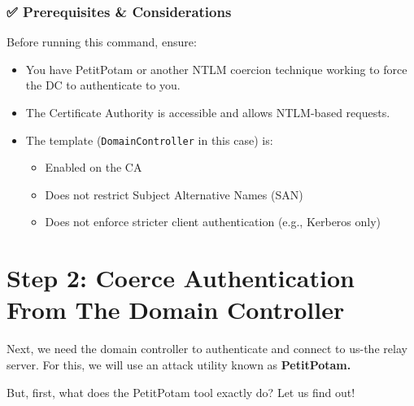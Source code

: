 \begin{warningbox}
\subsubsection{✅ Prerequisites \& Considerations}
Before running this command, ensure:
\begin{itemize}
    \item You have PetitPotam or another NTLM coercion technique working to force the DC to authenticate to you.
    \item The Certificate Authority is accessible and allows NTLM-based requests.
    \item The template (\verb|DomainController| in this case) is: \begin{itemize}
        \item Enabled on the CA
        \item Does not restrict Subject Alternative Names (SAN)
        \item Does not enforce stricter client authentication (e.g., Kerberos only)
    \end{itemize}
\end{itemize}
\end{warningbox}


\section{Step 2: Coerce Authentication From The Domain Controller}
Next, we need the domain controller to authenticate and connect to us-the relay server. For this, we will use an attack utility known as \textbf{PetitPotam.}

But, first, what does the PetitPotam tool exactly do? Let us find out!

